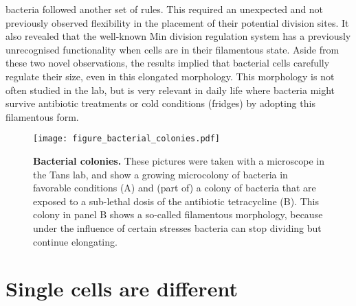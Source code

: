 bacteria followed another set of rules.
%
This required an unexpected and not previously observed flexibility in the placement of their potential division sites.
It also revealed that the well-known Min division regulation system has a previously unrecognised functionality when cells are in their filamentous state.
%
Aside from these two novel observations, 
the results implied that bacterial cells carefully regulate their size,
even in this elongated morphology.
%
This morphology is not often studied in the lab, 
but is very relevant in daily life where bacteria might survive antibiotic treatments or cold conditions (fridges) by adopting this filamentous form.
%

\begin{figure}
    \begin{minipage}[c]{0.5\textwidth}
        \texttt{[image: figure\_bacterial\_colonies.pdf]}
    \end{minipage}\hfill
    \begin{minipage}[c]{0.5\textwidth}
        \caption{ 
            \textbf{Bacterial colonies.}
            These pictures were taken with a microscope in the Tans lab, and show a growing microcolony of bacteria in favorable conditions (A) and (part of) a colony of bacteria that are exposed to a sub-lethal dosis of the antibiotic tetracycline (B). This colony in panel B shows a so-called filamentous morphology, because under the influence of certain stresses bacteria can stop dividing but continue elongating. 
        }
        \label{fig:intro:bacs}
    \end{minipage}
\end{figure}


\section{Single cells are different} 

